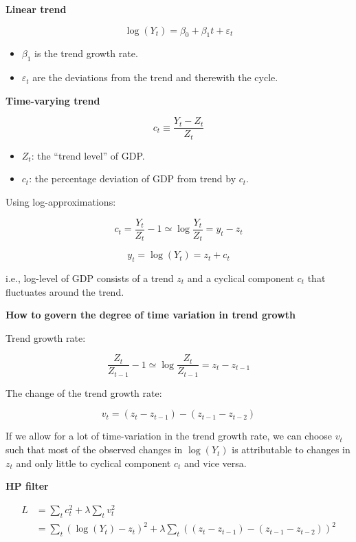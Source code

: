 \documentclass{article}
\begin{document}
\textbf{Linear trend}

\[\log(Y_t)=\beta_0+\beta_1 t+\varepsilon_t \]

\begin{itemize}
    \item $\beta_1$ is the trend growth rate.
    \item $\varepsilon_t$ are the deviations from the trend and therewith the cycle.
\end{itemize}

\textbf{Time-varying trend}

\[c_t\equiv\frac{Y_t-Z_t}{Z_t} \]

\begin{itemize}
    \item $Z_t$: the ``trend level'' of GDP.
    \item $c_t$: the percentage deviation of GDP from trend by $c_t$.
\end{itemize}

Using log-approximations:

\[c_t=\frac{Y_t}{Z_t}-1\simeq\log\frac{Y_t}{Z_t}=y_t-z_t \]

\[y_t=\log(Y_t)=z_t+c_t \]

i.e., log-level of GDP consists of a trend $z_t$ and a cyclical component $c_t$ that fluctuates around the trend.

\vspace{4mm}

\textbf{How to govern the degree of time variation in trend growth}

Trend growth rate:

\[\frac{Z_t}{Z_{t-1}}-1\simeq\log\frac{Z_t}{Z_{t-1}}=z_t-z_{t-1} \]

The change of the trend growth rate:

\[v_t=(z_t-z_{t-1})-(z_{t-1}-z_{t-2}) \]

If we allow for a lot of time-variation in the trend growth rate, we can choose $v_t$ such that most of the observed changes in $\log(Y_t)$ is attributable to changes in $z_t$ and only little to cyclical component $c_t$ and vice versa.

\vspace{4mm}

\textbf{HP filter}

\begin{align*}
    L&=\sum_t c_t^2 + \lambda\sum_t v_t^2 \\
    &=\sum_t (\log(Y_t)-z_t)^2 + \lambda\sum_t ((z_t-z_{t-1}) - (z_{t-1}-z_{t-2}))^2
\end{align*}
\end{document}
